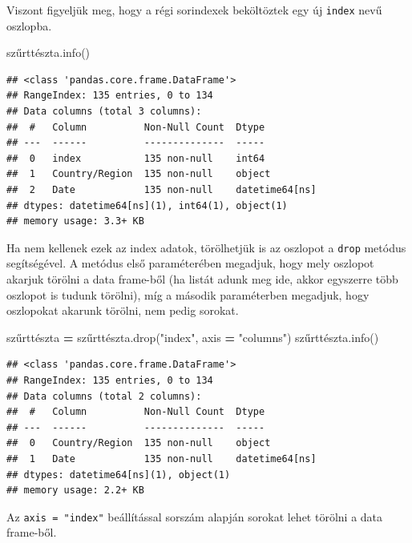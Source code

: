 \documentclass[
]{book}
\newenvironment{Shaded}{\begin{snugshade}}{\end{snugshade}}
\newcommand{\NormalTok}[1]{#1}
\newcommand{\OperatorTok}[1]{\textcolor[rgb]{0.81,0.36,0.00}{\textbf{#1}}}
\newcommand{\StringTok}[1]{\textcolor[rgb]{0.31,0.60,0.02}{#1}}
\begin{document}
Viszont figyeljük meg, hogy a régi sorindexek beköltöztek egy új \texttt{index} nevű oszlopba.

\begin{Shaded}
\begin{Highlighting}[]
\NormalTok{szűrttészta.info()}
\end{Highlighting}
\end{Shaded}

\begin{verbatim}
## <class 'pandas.core.frame.DataFrame'>
## RangeIndex: 135 entries, 0 to 134
## Data columns (total 3 columns):
##  #   Column          Non-Null Count  Dtype         
## ---  ------          --------------  -----         
##  0   index           135 non-null    int64         
##  1   Country/Region  135 non-null    object        
##  2   Date            135 non-null    datetime64[ns]
## dtypes: datetime64[ns](1), int64(1), object(1)
## memory usage: 3.3+ KB
\end{verbatim}

Ha nem kellenek ezek az index adatok, törölhetjük is az oszlopot a \texttt{drop} metódus segítségével. A metódus első paraméterében megadjuk, hogy mely oszlopot akarjuk törölni a data frame-ből (ha listát adunk meg ide, akkor egyszerre több oszlopot is tudunk törölni), míg a második paraméterben megadjuk, hogy oszlopokat akarunk törölni, nem pedig sorokat.

\begin{Shaded}
\begin{Highlighting}[]
\NormalTok{szűrttészta }\OperatorTok{=}\NormalTok{ szűrttészta.drop(}\StringTok{"index"}\NormalTok{, axis }\OperatorTok{=} \StringTok{"columns"}\NormalTok{)}
\NormalTok{szűrttészta.info()}
\end{Highlighting}
\end{Shaded}

\begin{verbatim}
## <class 'pandas.core.frame.DataFrame'>
## RangeIndex: 135 entries, 0 to 134
## Data columns (total 2 columns):
##  #   Column          Non-Null Count  Dtype         
## ---  ------          --------------  -----         
##  0   Country/Region  135 non-null    object        
##  1   Date            135 non-null    datetime64[ns]
## dtypes: datetime64[ns](1), object(1)
## memory usage: 2.2+ KB
\end{verbatim}

Az \texttt{axis\ =\ "index"} beállítással sorszám alapján sorokat lehet törölni a data frame-ből.
\end{document}
